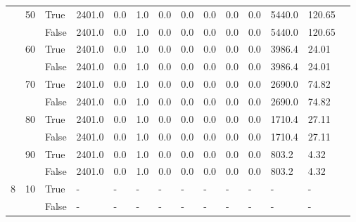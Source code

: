 \begin{landscape}
\begin{small}
\begin{longtable}[c]{@{}lll|ll|ll|ll|ll|lll@{}}
   & 50 & True  & 2401.0          & 0.0            & 1.0           & 0.0           & 0.0           & 0.0           & 0.0           & 0.0           & 5440.0        & 120.65      &  \\
   &    & False & 2401.0          & 0.0            & 1.0           & 0.0           & 0.0           & 0.0           & 0.0           & 0.0           & 5440.0        & 120.65      &  \\
   & 60 & True  & 2401.0          & 0.0            & 1.0           & 0.0           & 0.0           & 0.0           & 0.0           & 0.0           & 3986.4        & 24.01       &  \\
   &    & False & 2401.0          & 0.0            & 1.0           & 0.0           & 0.0           & 0.0           & 0.0           & 0.0           & 3986.4        & 24.01       &  \\
   & 70 & True  & 2401.0          & 0.0            & 1.0           & 0.0           & 0.0           & 0.0           & 0.0           & 0.0           & 2690.0        & 74.82       &  \\
   &    & False & 2401.0          & 0.0            & 1.0           & 0.0           & 0.0           & 0.0           & 0.0           & 0.0           & 2690.0        & 74.82       &  \\
   & 80 & True  & 2401.0          & 0.0            & 1.0           & 0.0           & 0.0           & 0.0           & 0.0           & 0.0           & 1710.4        & 27.11       &  \\
   &    & False & 2401.0          & 0.0            & 1.0           & 0.0           & 0.0           & 0.0           & 0.0           & 0.0           & 1710.4        & 27.11       &  \\
   & 90 & True  & 2401.0          & 0.0            & 1.0           & 0.0           & 0.0           & 0.0           & 0.0           & 0.0           & 803.2         & 4.32        &  \\
   &    & False & 2401.0          & 0.0            & 1.0           & 0.0           & 0.0           & 0.0           & 0.0           & 0.0           & 803.2         & 4.32        &  \\
  \midrule
8  & 10 & True  & -               & -              & -             & -             & -             & -             & -             & -             & -             & -           &  \\
   &    & False & -               & -              & -             & -             & -             & -             & -             & -             & -             & -           &  \\

\end{longtable}
\end{small}
\end{landscape}
